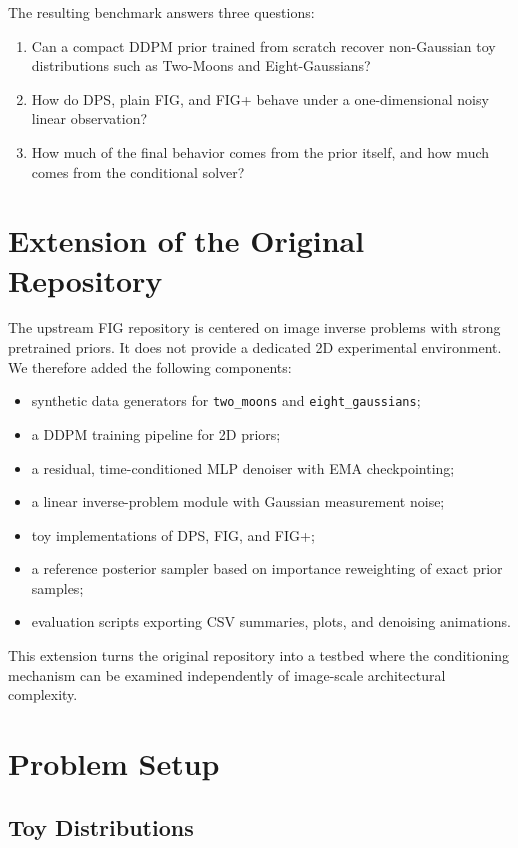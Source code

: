 \documentclass[10pt,twocolumn]{article}
\begin{document}
The resulting benchmark answers three questions:
\begin{enumerate}[leftmargin=1.5em]
    \item Can a compact DDPM prior trained from scratch recover non-Gaussian toy distributions such as Two-Moons and Eight-Gaussians?
    \item How do DPS, plain FIG, and FIG+ behave under a one-dimensional noisy linear observation?
    \item How much of the final behavior comes from the prior itself, and how much comes from the conditional solver?
\end{enumerate}

\section{Extension of the Original Repository}

The upstream FIG repository is centered on image inverse problems with strong pretrained priors. It does not provide a dedicated 2D experimental environment. We therefore added the following components:
\begin{itemize}[leftmargin=1.5em]
    \item synthetic data generators for \texttt{two\_moons} and \texttt{eight\_gaussians};
    \item a DDPM training pipeline for 2D priors;
    \item a residual, time-conditioned MLP denoiser with EMA checkpointing;
    \item a linear inverse-problem module with Gaussian measurement noise;
    \item toy implementations of DPS, FIG, and FIG+;
    \item a reference posterior sampler based on importance reweighting of exact prior samples;
    \item evaluation scripts exporting CSV summaries, plots, and denoising animations.
\end{itemize}

This extension turns the original repository into a testbed where the conditioning mechanism can be examined independently of image-scale architectural complexity.

\section{Problem Setup}

\subsection{Toy Distributions}
\end{document}

